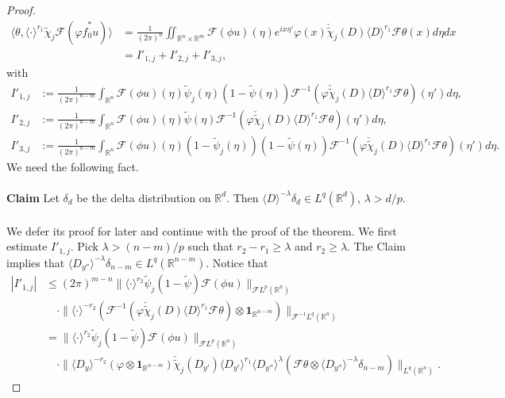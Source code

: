 \documentclass[12pt,reqno]{amsart}
\newcommand{\RR}{\mathbb R}
\theoremstyle{plain}
\theoremstyle{remark}
\theoremstyle{definition}
\numberwithin{equation}{section}
\begin{document}
\begin{proof}
\begin{align*}
\langle \theta,\langle\cdot\rangle^{r_1}\widetilde{\chi}_j\mathcal{F}(\varphi \hat{f}_0^*u)\rangle& =\frac{1}{(2\pi)^n}\iint_{\RR^n\times\RR^m}\mathcal{F}(\phi u)(\eta)e^{ix\eta'}\varphi(x)\check{\widetilde{\chi}}_j(D)\langle D\rangle^{r_1}\mathcal{F}\theta(x)d\eta dx\\
&=I'_{1,j}+I'_{2,j}+I'_{3,j},
\end{align*}
with
\begin{align*}
I'_{1,j}&:=\frac{1}{(2\pi)^{n-m}}\int_{\RR^n}\mathcal{F}(\phi u)(\eta) \widetilde{\psi}_j(\eta)(1-\widetilde{\psi}(\eta))\mathcal{F}^{-1}(\varphi\check{\widetilde{\chi}}_j(D)\langle D\rangle^{r_1}\mathcal{F}\theta)(\eta')d\eta,\\
I'_{2,j}&:=\frac{1}{(2\pi)^{n-m}}\int_{\RR^n}\mathcal{F}(\phi u)(\eta)\widetilde{\psi}(\eta)\mathcal{F}^{-1}(\varphi\check{\widetilde{\chi}}_j(D)\langle D\rangle^{r_1}\mathcal{F}\theta)(\eta')d\eta,\\
I'_{3,j}&:=\frac{1}{(2\pi)^{n-m}}\int_{\RR^n}\mathcal{F}(\phi u)(\eta) (1-\widetilde{\psi}_j(\eta))(1-\widetilde{\psi}(\eta))\mathcal{F}^{-1}(\varphi\check{\widetilde{\chi}}_j(D)\langle D\rangle^{r_1}\mathcal{F}\theta)(\eta')d\eta.
\end{align*}
We need the following fact.\\
\\
\noindent \textbf{Claim} Let $\delta_d$ be the delta distribution on $\RR^d$. Then $\langle D\rangle^{-\lambda}\delta_d\in L^q(\RR^d)$, $\lambda>d/p$.\\
\\
We defer its proof for later and continue with the proof of the theorem. We first estimate $I'_{1,j}$. Pick $\lambda>(n-m)/p$ such that $r_2-r_1\geq\lambda$ and $r_2\geq\lambda$. The Claim implies that $\langle D_{y''}\rangle^{-\lambda}\delta_{n-m}\in L^q(\RR^{n-m})$. Notice that
\begin{align}
|I'_{1,j}|&\leq (2\pi)^{m-n}\|\langle\cdot\rangle^{r_2}\widetilde{\psi}_j(1-\widetilde{\psi})\mathcal{F}(\phi u)\|_{\mathcal{F}L^p(\RR^n)}\nonumber\\
&\quad\cdot\|\langle\cdot\rangle^{-r_2}(\mathcal{F}^{-1}(\varphi\check{\widetilde{\chi}}_j(D)\langle D\rangle^{r_1}\mathcal{F}\theta)\otimes\mathbf{1}_{\RR^{n-m}})\|_{\mathcal{F}^{-1}L^q(\RR^n)}\nonumber\\
&= \|\langle\cdot\rangle^{r_2}\widetilde{\psi}_j(1-\widetilde{\psi})\mathcal{F}(\phi u)\|_{\mathcal{F}L^p(\RR^n)}\nonumber\\
&\quad\cdot\|\langle D_y\rangle^{-r_2}(\varphi\otimes\mathbf{1}_{\RR^{n-m}})\check{\widetilde{\chi}}_j(D_{y'})\langle D_{y'}\rangle^{r_1}\langle D_{y''}\rangle^{\lambda}(\mathcal{F}\theta\otimes\langle D_{y''}\rangle^{-\lambda}\delta_{n-m})\|_{L^q(\RR^n)}.\label{ine-for-iprjklskr}

\end{align}
\end{proof}
\end{document}
